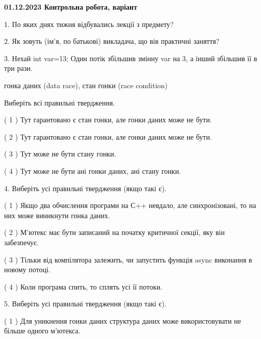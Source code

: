 \documentclass[12pt, ukrainian]{article}
\begin{document}
\vspace{4mm}
\newpage
\begin {large}

\textbf{01.12.2023 Контрольна робота, варіант  }\par


{
1. По яких днях тижня відбувались лекції з предмету?



\vspace{5mm}
2. Як зовуть (ім'я, по батькові) викладача, що вів практичні заняття?



\vspace{5mm}
3. Нехай int var=13; Один потік збільшив змінну var на 3, а інший збільшив її в три рази.

гонка даних (data race), стан гонки (race condition)

Виберіть всі правильні твердження.\par
\vspace{2mm}
( 1 ) Тут гарантовано є стан гонки, але гонки даних може не бути.%

( 2 ) Тут гарантовано є стан гонки, але гонки даних може не бути.%

( 3 ) Тут може не бути стану гонки.%

( 4 ) Тут може не бути ані гонки даних, ані стану гонки.%


\vspace{5mm}
4. Виберіть усі правильні твердження (якщо такі є).\par
\vspace{2mm}

( 1 ) Якщо два обчислення програми на С++ невдало, але синхронізовані, то на них може виникнути гонка даних.%

( 2 ) М’ютекс має бути записаний на початку критичної секції, яку він забезпечує.%

( 3 ) Тільки від компілятора залежить, чи запустить функція async виконання в новому потоці.%

( 4 ) Коли програма спить, то сплять усі її потоки.%


\vspace{5mm}
5. Виберіть усі правильні твердження (якщо такі є).\par
\vspace{2mm}

( 1 ) Для уникнення гонки даних структура даних може використовувати не більше одного м’ютекса.%

}
\end{large}
\end{document}
